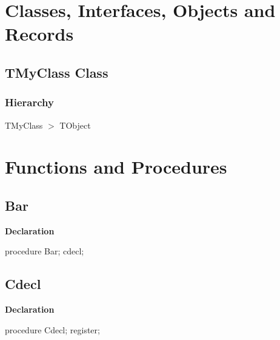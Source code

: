 \documentclass{report}
\begin{document}
\section{Classes, Interfaces, Objects and Records}
\subsection*{TMyClass Class}
\subsubsection*{\large{\textbf{Hierarchy}}\normalsize\hspace{1ex}\hfill}
TMyClass {$>$} TObject
\section{Functions and Procedures}
\subsection*{Bar}
\begin{list}{}{
\setlength{\itemindent}{0cm}
\setlength{\listparindent}{0cm}
\setlength{\leftmargin}{\evensidemargin}
\addtolength{\leftmargin}{\tmplength}
\settowidth{\labelsep}{X}
\addtolength{\leftmargin}{\labelsep}
\setlength{\labelwidth}{\tmplength}
}
\begin{flushleft}
\item[\textbf{Declaration}\hfill]
\begin{ttfamily}
procedure Bar; cdecl;\end{ttfamily}


\end{flushleft}
\end{list}
\subsection*{Cdecl}
\begin{list}{}{
\setlength{\itemindent}{0cm}
\setlength{\listparindent}{0cm}
\setlength{\leftmargin}{\evensidemargin}
\addtolength{\leftmargin}{\tmplength}
\settowidth{\labelsep}{X}
\addtolength{\leftmargin}{\labelsep}
\setlength{\labelwidth}{\tmplength}
}
\begin{flushleft}
\item[\textbf{Declaration}\hfill]
\begin{ttfamily}
procedure Cdecl; register;\end{ttfamily}


\end{flushleft}
\end{list}
\end{document}
